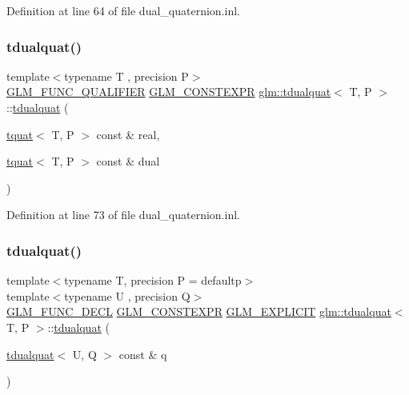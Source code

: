 Definition at line 64 of file dual\+\_\+quaternion.\+inl.

\mbox{\label{structglm_1_1tdualquat_a26de194ec794353ab7b5c1e65994c95e}} 
\subsubsection{\texorpdfstring{tdualquat()}{tdualquat()}\hspace{0.1cm}{\footnotesize\ttfamily [7/12]}}
{\footnotesize\ttfamily template$<$typename T , precision P$>$ \\
\mbox{\hyperlink{setup_8hpp_a33fdea6f91c5f834105f7415e2a64407}{G\+L\+M\+\_\+\+F\+U\+N\+C\+\_\+\+Q\+U\+A\+L\+I\+F\+I\+ER}} \mbox{\hyperlink{setup_8hpp_a08b807947b47031d3a511f03f89645ad}{G\+L\+M\+\_\+\+C\+O\+N\+S\+T\+E\+X\+PR}} \mbox{\hyperlink{structglm_1_1tdualquat}{glm\+::tdualquat}}$<$ T, P $>$\+::\mbox{\hyperlink{structglm_1_1tdualquat}{tdualquat}} (\begin{DoxyParamCaption}\item[{\mbox{\hyperlink{structglm_1_1tquat}{tquat}}$<$ T, P $>$ const \&}]{real,  }\item[{\mbox{\hyperlink{structglm_1_1tquat}{tquat}}$<$ T, P $>$ const \&}]{dual }\end{DoxyParamCaption})}



Definition at line 73 of file dual\+\_\+quaternion.\+inl.

\mbox{\label{structglm_1_1tdualquat_a9d75ca4f603fa51106665a5eb46606fe}} 
\subsubsection{\texorpdfstring{tdualquat()}{tdualquat()}\hspace{0.1cm}{\footnotesize\ttfamily [8/12]}}
{\footnotesize\ttfamily template$<$typename T, precision P = defaultp$>$ \\
template$<$typename U , precision Q$>$ \\
\mbox{\hyperlink{setup_8hpp_ab2d052de21a70539923e9bcbf6e83a51}{G\+L\+M\+\_\+\+F\+U\+N\+C\+\_\+\+D\+E\+CL}} \mbox{\hyperlink{setup_8hpp_a08b807947b47031d3a511f03f89645ad}{G\+L\+M\+\_\+\+C\+O\+N\+S\+T\+E\+X\+PR}} \mbox{\hyperlink{setup_8hpp_a6c74f5a5e7b134ab69023ff9a30d4d5d}{G\+L\+M\+\_\+\+E\+X\+P\+L\+I\+C\+IT}} \mbox{\hyperlink{structglm_1_1tdualquat}{glm\+::tdualquat}}$<$ T, P $>$\+::\mbox{\hyperlink{structglm_1_1tdualquat}{tdualquat}} (\begin{DoxyParamCaption}\item[{\mbox{\hyperlink{structglm_1_1tdualquat}{tdualquat}}$<$ U, Q $>$ const \&}]{q }\end{DoxyParamCaption})}

